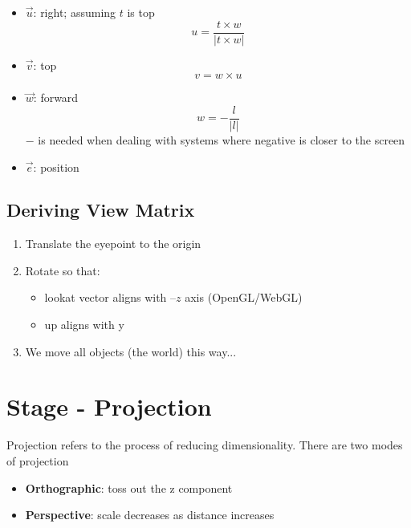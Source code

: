   \begin{itemize}
    \item $ \vec{u} $: right; assuming $ t $ is top
    \begin{equation}
      u = \frac{t \times w}{\left| t \times w \right|}
    \end{equation}

    \item $ \vec{v} $: top
    \begin{equation}
      v = w \times u
    \end{equation}

    \item $ \vec{w} $: forward
    \begin{equation}
      w = - \frac{l}{\left| l \right|}
    \end{equation}
    $ - $ is needed when dealing with systems where negative is closer to the
    screen

    \item $ \vec{e} $: position
  \end{itemize}

  \subsection{Deriving View Matrix}

    \begin{enumerate}
      \item Translate the eyepoint to the origin
      \item Rotate so that:
      \begin{itemize}
        \item lookat vector aligns with $ –z $ axis (OpenGL/WebGL)
        \item up aligns with y
      \end{itemize}

      \item We move all objects (the world) this way...
    \end{enumerate}

\section{Stage - Projection}

  Projection refers to the process of reducing dimensionality. There are two
  modes of projection

  \begin{itemize}
    \item \textbf{Orthographic}: toss out the z component
    \item \textbf{Perspective}: scale decreases as distance increases
  \end{itemize}

